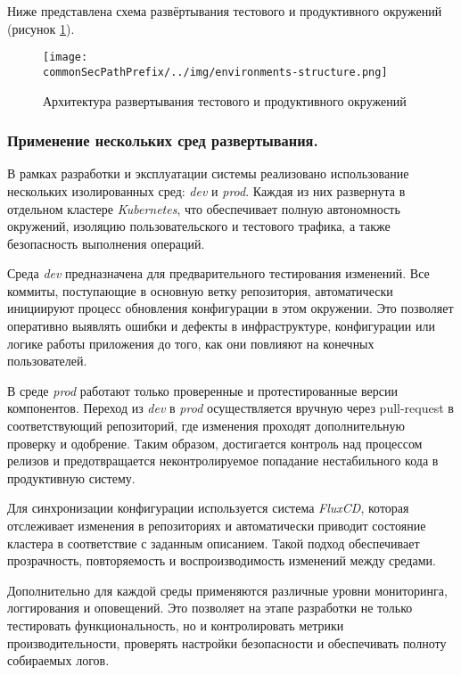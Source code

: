 Ниже представлена схема развёртывания тестового и продуктивного окружений (рисунок \ref{fig:environments-structure.png}).

\begin{figure}[ht]
    \centering
    \texttt{[image: \\commonSecPathPrefix/../img/environments-structure.png]}
    \caption{Архитектура развертывания тестового и продуктивного окружений}
    \label{fig:environments-structure.png}
\end{figure}

\subsubsection{Применение нескольких сред развертывания.}
В рамках разработки и эксплуатации системы реализовано использование нескольких изолированных сред: \textit{dev} и \textit{prod}. Каждая из них развернута в отдельном кластере \textit{Kubernetes}, что обеспечивает полную автономность окружений, изоляцию пользовательского и тестового трафика, а также безопасность выполнения операций.

Среда \textit{dev} предназначена для предварительного тестирования изменений. Все коммиты, поступающие в основную ветку репозитория, автоматически инициируют процесс обновления конфигурации в этом окружении. Это позволяет оперативно выявлять ошибки и дефекты в инфраструктуре, конфигурации или логике работы приложения до того, как они повлияют на конечных пользователей.

В среде \textit{prod} работают только проверенные и протестированные версии компонентов. Переход из \textit{dev} в \textit{prod} осуществляется вручную через pull-request в соответствующий репозиторий, где изменения проходят дополнительную проверку и одобрение. Таким образом, достигается контроль над процессом релизов и предотвращается неконтролируемое попадание нестабильного кода в продуктивную систему.

Для синхронизации конфигурации используется система \textit{FluxCD}, которая отслеживает изменения в репозиториях и автоматически приводит состояние кластера в соответствие с заданным описанием. Такой подход обеспечивает прозрачность, повторяемость и воспроизводимость изменений между средами.

Дополнительно для каждой среды применяются различные уровни мониторинга, логгирования и оповещений. Это позволяет на этапе разработки не только тестировать функциональность, но и контролировать метрики производительности, проверять настройки безопасности и обеспечивать полноту собираемых логов.


